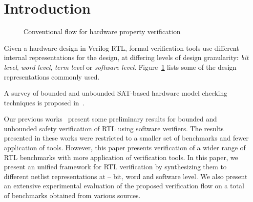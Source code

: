 \section{Introduction}\label{sec:intro}
%
\begin{figure}[htbp]
\centering
\vspace*{0.3cm}
\caption{Conventional flow for hardware property verification\label{fig:desc}}
\end{figure}
%
 Given a hardware design in Verilog RTL, formal
verification tools use different internal representations for the design, at 
differing levels of design granularity: \emph{bit level}, \emph{word level}, 
\emph{term level} or \emph{software level}.  Figure~\ref{fig:desc} lists 
some of the design representations commonly used.  

A survey of bounded and unbounded SAT-based hardware model checking techniques 
is proposed in~\cite{charme05}.



Our previous works~\cite{mkm2015,mskm2016,mtk2016} present some preliminary results 
for bounded and unbounded safety verification of RTL using software verifiers.  
The results presented in these works were restricted to a smaller set of benchmarks and fewer application 
of tools.  However, this paper presents verification of a wider range of 
RTL benchmarks with more application of verification tools.  
In this paper, we present an unified framework for RTL verification by synthesizing 
them to different netlist representations at -- bit, word and software level. We 
also present an extensive experimental evaluation of the proposed verification flow 
on a total of  benchmarks obtained from various sources.

